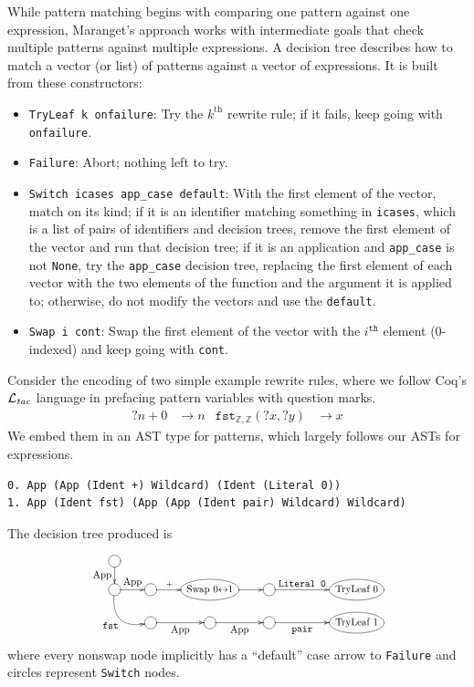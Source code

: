 \documentclass[sn-mathphys,pdflatex]{sn-jnl}%
\newcommand{\Ltac}{\ensuremath{\mathcal{L}_\text{\emph{tac}}}}
\theoremstyle{thmstyleone}%
\theoremstyle{thmstyletwo}%
\theoremstyle{thmstylethree}%
\begin{document}
While pattern matching begins with comparing one pattern against one expression, Maranget's approach works with intermediate goals that check multiple patterns against multiple expressions.
A decision tree describes how to match a vector (or list) of patterns against a vector of expressions.
It is built from these constructors:
\begin{itemize}
  \item \texttt{TryLeaf k onfailure}: Try the $k^\text{th}$ rewrite rule; if it fails, keep going with \texttt{onfailure}.
  \item \texttt{Failure}: Abort; nothing left to try.
  \item \texttt{Switch icases app\_case default}:
    With the first element of the vector, match on its kind; if it is an identifier matching something in \texttt{icases}, which is a list of pairs of identifiers and decision trees, remove the first element of the vector and run that decision tree; if it is an application and \texttt{app\_case} is not \texttt{None}, try the \texttt{app\_case} decision tree, replacing the first element of each vector with the two elements of the function and the argument it is applied to; otherwise, do not modify the vectors and use the \texttt{default}.
  \item \texttt{Swap i cont}: Swap the first element of the vector with the $i^\texttt{th}$ element (0-indexed) and keep going with \texttt{cont}.
\end{itemize}

Consider the encoding of two simple example rewrite rules, where we follow Coq's \Ltac{} language in prefacing pattern variables with question marks.
\begin{align*}
  ?n + 0 & \to n %
  &
  \texttt{fst}_{\mathbb{Z},\mathbb{Z}}(?x, ?y) & \to x
\end{align*}
We embed them in an AST type for patterns, which largely follows our ASTs for expressions.
\begin{verbatim}
0. App (App (Ident +) Wildcard) (Ident (Literal 0))
1. App (Ident fst) (App (App (Ident pair) Wildcard) Wildcard)
\end{verbatim}
The decision tree produced is\label{sec:compiled-pattern}
\[\resizebox{230px}{!}{\xymatrix@R-1pc{
  *++[o][F-]\txt{} \ar[d]_{\txt{App}} \\
  *++[o][F-]\txt{} \ar[r]^-{\txt{App}} \ar@/_1.5pc/[dr]_{\txt{\texttt{fst}}} & *++[o][F-]\txt{} \ar[r]^-{+} & *++[o][F-]\txt{Swap 0$\leftrightarrow$1} \ar[r] & *++[o][F-]\txt{} \ar[rr]^-{\txt{\texttt{Literal~0}}} && *++[o][F-]\txt{TryLeaf 0} \\
  & *++[o][F-]\txt{} \ar[r]_-{\txt{App}} & *++[o][F-]\txt{} \ar[r]_-{\txt{App}} & *++[o][F-]\txt{} \ar[rr]_-{\txt{\texttt{pair}}} && *++[o][F-]\txt{TryLeaf 1}
}}\]
\noindent where every nonswap node implicitly has a ``default'' case arrow to \texttt{Failure} and circles represent \texttt{Switch} nodes.
\end{document}
